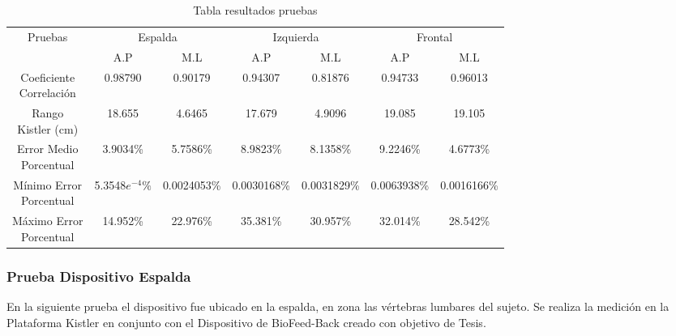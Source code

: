 \documentclass[12pt,a4paper]{article}
\newcommand{\nombreDispositivo}{Dispositivo de BioFeed-Back }
\begin{document}
\begin{table}[H]
	\label{table:resultadosPruebas}
	\centering
	\begin{tabular}{|c|c|c|c|c|c|c|}
		\hline
		\multirow{2}{*}{Pruebas} &
		\multicolumn{2}{c|}{Espalda} &
		\multicolumn{2}{c|}{Izquierda} &
		\multicolumn{2}{c|}{Frontal} \\
		\cline{2-7}
		& A.P & M.L & A.P  & M.L & A.P & M.L \\
		\hline
		\shortstack{Coeficiente\\Correlación} & 0.98790 &0.90179 & 0.94307 & 0.81876 & 0.94733 & 0.96013 \\
		\hline
		\shortstack{Rango\\Kistler (cm)} & 18.655 & 4.6465 & 17.679 & 4.9096 & 19.085 & 19.105 \\
		\hline
		\shortstack{Error Medio\\Porcentual} & 3.9034\% & 5.7586\% & 8.9823\% & 8.1358\% & 9.2246\% & 4.6773\% \\
		\hline
		\shortstack{Mínimo Error\\Porcentual} & 5.3548$e^{-4}\%$ & 0.0024053\% & 0.0030168\% & 0.0031829\% & 0.0063938\% & 0.0016166\% \\
		\hline
		\shortstack{Máximo Error\\Porcentual} & 14.952\% & 22.976\% & 35.381\% & 30.957\% & 32.014\% & 28.542\% \\
		\hline
	\end{tabular}
	\caption{Tabla resultados pruebas}
\end{table}	
  
\subsubsection{Prueba Dispositivo Espalda} En la siguiente prueba el dispositivo fue ubicado en la espalda, en zona las vértebras lumbares del sujeto. Se realiza la medición en la Plataforma Kistler en conjunto con el \nombreDispositivo creado con objetivo de Tesis.
		
\end{document}
